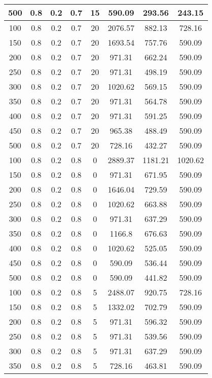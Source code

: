 \documentclass[a4paper, 12pt]{extreport}
\begin{document}
\begin{itemize}
\begin{longtable}{|c|c|c|c|c|c|c|c|}
			500 & 0.8 & 0.2 & 0.7 & 15 & 590.09 & 293.56 & 243.15 \\\hline
			100 & 0.8 & 0.2 & 0.7 & 20 & 2076.57 & 882.13 & 728.16 \\\hline
			150 & 0.8 & 0.2 & 0.7 & 20 & 1693.54 & 757.76 & 590.09 \\\hline
			200 & 0.8 & 0.2 & 0.7 & 20 & 971.31 & 662.24 & 590.09 \\\hline
			250 & 0.8 & 0.2 & 0.7 & 20 & 971.31 & 498.19 & 590.09 \\\hline
			300 & 0.8 & 0.2 & 0.7 & 20 & 1020.62 & 569.15 & 590.09 \\\hline
			350 & 0.8 & 0.2 & 0.7 & 20 & 971.31 & 564.78 & 590.09 \\\hline
			400 & 0.8 & 0.2 & 0.7 & 20 & 971.31 & 591.25 & 590.09 \\\hline
			450 & 0.8 & 0.2 & 0.7 & 20 & 965.38 & 488.49 & 590.09 \\\hline
			500 & 0.8 & 0.2 & 0.7 & 20 & 728.16 & 432.27 & 590.09 \\\hline
			100 & 0.8 & 0.2 & 0.8 & 0 & 2889.37 & 1181.21 & 1020.62 \\\hline
			150 & 0.8 & 0.2 & 0.8 & 0 & 971.31 & 671.95 & 590.09 \\\hline
			200 & 0.8 & 0.2 & 0.8 & 0 & 1646.04 & 729.59 & 590.09 \\\hline
			250 & 0.8 & 0.2 & 0.8 & 0 & 1020.62 & 663.88 & 590.09 \\\hline
			300 & 0.8 & 0.2 & 0.8 & 0 & 971.31 & 637.29 & 590.09 \\\hline
			350 & 0.8 & 0.2 & 0.8 & 0 & 1166.8 & 676.63 & 590.09 \\\hline
			400 & 0.8 & 0.2 & 0.8 & 0 & 1020.62 & 525.05 & 590.09 \\\hline
			450 & 0.8 & 0.2 & 0.8 & 0 & 590.09 & 536.44 & 590.09 \\\hline
			500 & 0.8 & 0.2 & 0.8 & 0 & 590.09 & 441.82 & 590.09 \\\hline
			100 & 0.8 & 0.2 & 0.8 & 5 & 2488.07 & 920.75 & 728.16 \\\hline
			150 & 0.8 & 0.2 & 0.8 & 5 & 1332.02 & 702.79 & 590.09 \\\hline
			200 & 0.8 & 0.2 & 0.8 & 5 & 971.31 & 596.32 & 590.09 \\\hline
			250 & 0.8 & 0.2 & 0.8 & 5 & 971.31 & 539.56 & 590.09 \\\hline
			300 & 0.8 & 0.2 & 0.8 & 5 & 971.31 & 637.29 & 590.09 \\\hline
			350 & 0.8 & 0.2 & 0.8 & 5 & 728.16 & 463.81 & 590.09 \\\hline

\end{longtable}
\end{itemize}
\end{document}
